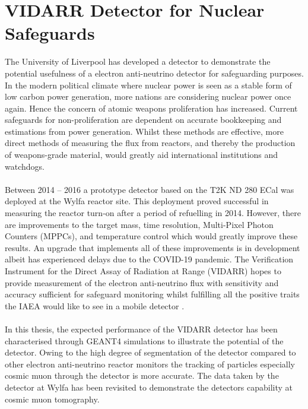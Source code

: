 \section{VIDARR Detector for Nuclear Safeguards}
The University of Liverpool has developed a detector to demonstrate the potential usefulness of a electron anti-neutrino detector for safeguarding purposes. In the modern political climate where nuclear power is seen as a stable form of low carbon power generation, more nations are considering nuclear power once again. Hence the concern of atomic weapons proliferation has increased. Current safeguards for non-proliferation are dependent on accurate bookkeeping and estimations from power generation. Whilst these methods are effective, more direct methods of measuring the flux from reactors, and thereby the production of weapons-grade material, would greatly aid international institutions and watchdogs.
\\\\Between 2014 -- 2016 a prototype detector based on the T2K ND 280 ECal \cite{Allan_2013} was deployed at the Wylfa reactor site. This deployment proved successful in measuring the reactor turn-on after a period of refuelling in 2014. However, there are improvements to the target mass, time resolution, Multi-Pixel Photon Counters (MPPCs), and temperature control which would greatly improve these results. An upgrade that implements all of these improvements is in development albeit has experienced delays due to the COVID-19 pandemic. The Verification Instrument for the Direct Assay of Radiation at Range (VIDARR) hopes to provide measurement of the electron anti-neutrino flux with sensitivity and accuracy sufficient for safeguard monitoring whilst fulfilling all the positive traits the IAEA would like to see in a mobile detector \cite{IAEA_2008}.
\\\\In this thesis, the expected performance of the VIDARR detector has been characterised through GEANT4 \cite{Agostinelli:2002hh} simulations to illustrate the potential of the detector. Owing to the high degree of segmentation of the detector compared to other electron anti-neutrino reactor monitors the tracking of particles especially cosmic muon through the detector is more accurate. The data taken by the detector at Wylfa has been revisited to demonstrate the detectors capability at cosmic muon tomography.

